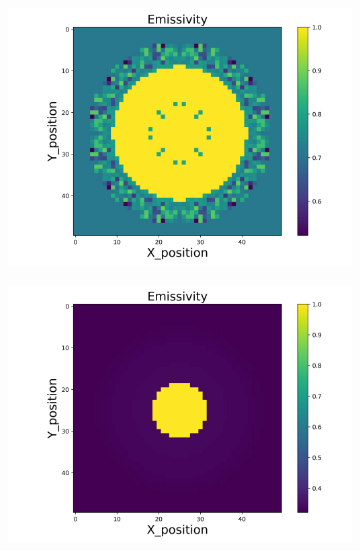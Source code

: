 \begin{figure}[p]
    \centering
    \begin{minipage}{\textwidth}
        \centering
        \begin{subfigure}{0.325\textwidth}
            \centering
            \includegraphics[width=\textwidth]{figures/raw_data/0/mix/emi_cal.jpg}
        \end{subfigure}
        \begin{subfigure}{0.325\textwidth}
            \centering
            \includegraphics[width=\textwidth]{figures/raw_data/5/mix/emi_cal.jpg}
        \end{subfigure}

\end{minipage}
\end{figure}
